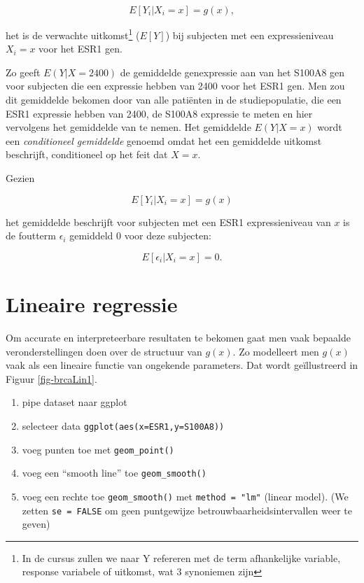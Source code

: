 \documentclass[
  dutch,
  letterpaper,
  12pt]{book}
\providecommand{\tightlist}{%
  \setlength{\itemsep}{0pt}\setlength{\parskip}{0pt}}
\theoremstyle{definition}
\theoremstyle{definition}
\theoremstyle{definition}
\theoremstyle{remark}
\begin{document}
\[E[Y_i|X_i=x]=g(x),\]

het is de verwachte uitkomst\footnote{In de cursus zullen we naar Y
  refereren met de term afhankelijke variable, response variabele of
  uitkomst, wat 3 synoniemen zijn} (\(E[Y]\)) bij subjecten met een
expressieniveau \(X_i=x\) voor het ESR1 gen.

Zo geeft \(E(Y|X=2400)\) de gemiddelde genexpressie aan van het S100A8
gen voor subjecten die een expressie hebben van 2400 voor het ESR1 gen.
Men zou dit gemiddelde bekomen door van alle patiënten in de
studiepopulatie, die een ESR1 expressie hebben van 2400, de S100A8
expressie te meten en hier vervolgens het gemiddelde van te nemen. Het
gemiddelde \(E(Y|X=x)\) wordt een \emph{conditioneel gemiddelde} genoemd
omdat het een gemiddelde uitkomst beschrijft, conditioneel op het feit
dat \(X=x\).

Gezien

\[E[Y_i|X_i=x]=g(x)\]

het gemiddelde beschrijft voor subjecten met een ESR1 expressieniveau
van \(x\) is de foutterm \(\epsilon_i\) gemiddeld 0 voor deze subjecten:

\[E[\epsilon_i\vert X_i=x]=0.\]

\section{Lineaire regressie}\label{lineaire-regressie}

Om accurate en interpreteerbare resultaten te bekomen gaat men vaak
bepaalde veronderstellingen doen over de structuur van \(g(x)\). Zo
modelleert men \(g(x)\) vaak als een lineaire functie van ongekende
parameters. Dat wordt geïllustreerd in Figuur \ref{fig-brcaLin1}.

\begin{enumerate}
\def\labelenumi{\arabic{enumi}.}
\tightlist
\item
  pipe dataset naar ggplot
\item
  selecteer data \texttt{ggplot(aes(x=ESR1,y=S100A8))}
\item
  voeg punten toe met \texttt{geom\_point()}
\item
  voeg een ``smooth line'' toe \texttt{geom\_smooth()}
\item
  voeg een rechte toe \texttt{geom\_smooth()} met
  \texttt{method\ =\ "lm"} (linear model). (We zetten
  \texttt{se\ =\ FALSE} om geen puntgewijze betrouwbaarheidsintervallen
  weer te geven)
\end{enumerate}
\end{document}
